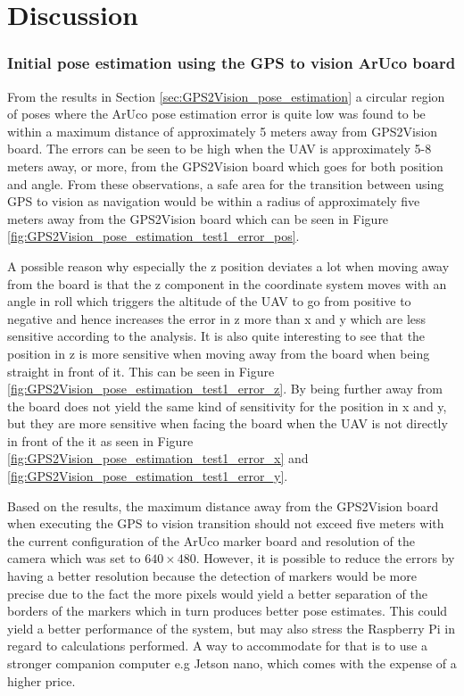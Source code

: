 \documentclass[../Head/report.tex]{subfiles}
\begin{document}
\section{Discussion}
\label{sec:discussion}

\subsubsection*{Initial pose estimation using the GPS to vision ArUco board}
From the results in Section \ref{sec:GPS2Vision_pose_estimation} a circular region of poses where the ArUco pose estimation error is quite low was found to be within a maximum distance of approximately 5 meters away from GPS2Vision board. The errors can be seen to be high when the UAV is approximately 5-8 meters away, or more, from the GPS2Vision board which goes for both position and angle. From these observations, a safe area for the transition between using GPS to vision as navigation would be within a radius of approximately five meters away from the GPS2Vision board which can be seen in Figure \ref{fig:GPS2Vision_pose_estimation_test1_error_pos}. 

A possible reason why especially the z position deviates a lot when moving away from the board is that the z component in the coordinate system moves with an angle in roll which triggers the altitude of the UAV to go from positive to negative and hence increases the error in z more than x and y which are less sensitive according to the analysis. It is also quite interesting to see that the position in z is more sensitive when moving away from the board when being straight in front of it. This can be seen in Figure \ref{fig:GPS2Vision_pose_estimation_test1_error_z}. By being further away from the board does not yield the same kind of sensitivity for the position in x and y, but they are more sensitive when facing the board when the UAV is not directly in front of the it as seen in Figure \ref{fig:GPS2Vision_pose_estimation_test1_error_x} and \ref{fig:GPS2Vision_pose_estimation_test1_error_y}.   

Based on the results, the maximum distance away from the GPS2Vision board when executing the GPS to vision transition should not exceed five meters with the current configuration of the ArUco marker board and resolution of the camera which was set to $640 \times 480$. However, it is possible to reduce the errors by having a better resolution because the detection of markers would be more precise due to the fact the more pixels would yield a better separation of the borders of the markers which in turn produces better pose estimates. This could yield a better performance of the system, but may also stress the Raspberry Pi in regard to calculations performed. A way to accommodate for that is to use a stronger companion computer e.g Jetson nano, which comes with the expense of a higher price.
\end{document}
